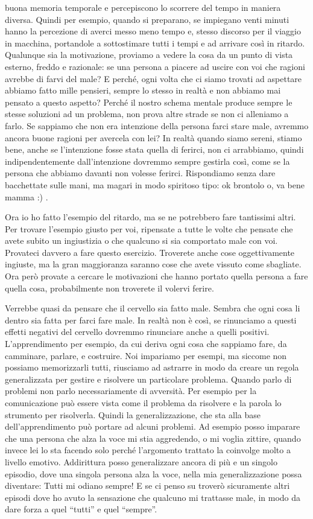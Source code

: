 \documentclass[12pt]{book} %
\begin{document}
buona memoria temporale e percepiscono lo scorrere del tempo in maniera diversa. Quindi per esempio, quando si
preparano, se impiegano venti minuti hanno la percezione di averci messo meno tempo e, stesso discorso per il viaggio
in macchina, portandole a sottostimare tutti i tempi e ad arrivare così in ritardo. Qualunque sia la motivazione,
proviamo a vedere la cosa da un punto di vista esterno, freddo e razionale: se una persona a piacere ad uscire con voi
che ragioni avrebbe di farvi del male? E perché, ogni volta che ci siamo trovati ad aspettare abbiamo fatto mille
pensieri, sempre lo stesso in realtà e non abbiamo mai pensato a questo aspetto? Perché il nostro schema mentale
produce sempre le stesse soluzioni ad un problema, non prova altre strade se non ci alleniamo a farlo. Se sappiamo che
non era intenzione della persona farci stare male, avremmo ancora buone ragioni per avercela con lei? In realtà quando
siamo sereni, stiamo bene, anche se l'intenzione fosse stata quella di ferirci, non ci arrabbiamo,
quindi indipendentemente dall'intenzione dovremmo sempre gestirla così, come se la persona che
abbiamo davanti non volesse ferirci. Rispondiamo senza dare bacchettate sulle mani, ma magari in modo spiritoso tipo:
ok brontolo o, va bene mamma :) .

Ora io ho fatto l'esempio del ritardo, ma se ne potrebbero fare tantissimi altri. Per trovare
l'esempio giusto per voi, ripensate a tutte le volte che pensate che avete subito un ingiustizia o
che qualcuno si sia comportato male con voi. Provateci davvero a fare questo esercizio. Troverete anche cose
oggettivamente ingiuste, ma la gran maggioranza saranno cose che avete vissuto come sbagliate. Ora però provate a
cercare le motivazioni che hanno portato quella persona a fare quella cosa, probabilmente non troverete il volervi
ferire.

Verrebbe quasi da pensare che il cervello sia fatto male. Sembra che ogni cosa li dentro sia fatta per farci fare male.
In realtà non è così, se rinunciamo a questi effetti negativi del cervello dovremmo rinunciare anche a quelli positivi.
L'apprendimento per esempio, da cui deriva ogni cosa che sappiamo fare, da camminare, parlare, e
costruire. Noi impariamo per esempi, ma siccome non possiamo memorizzarli tutti, riusciamo ad astrarre in modo da
creare un regola generalizzata per gestire e risolvere un particolare problema. Quando parlo di problemi non parlo
necessariamente di avversità. Per esempio per la comunicazione può essere vista come il problema da risolvere e la
parola lo strumento per risolverla. Quindi la generalizzazione, che sta alla base
dell'apprendimento può portare ad alcuni problemi. Ad esempio posso imparare che una persona che
alza la voce mi stia aggredendo, o mi voglia zittire, quando invece lei lo sta facendo solo perché
l'argomento trattato la coinvolge molto a livello emotivo. Addirittura posso generalizzare ancora
di più e un singolo episodio, dove una singola persona alza la voce, nella mia generalizzazione possa diventare: Tutti
mi odiano sempre! E se ci penso su troverò sicuramente altri episodi dove ho avuto la sensazione che qualcuno mi
trattasse male, in modo da dare forza a quel “tutti” e quel “sempre”.
\end{document}
